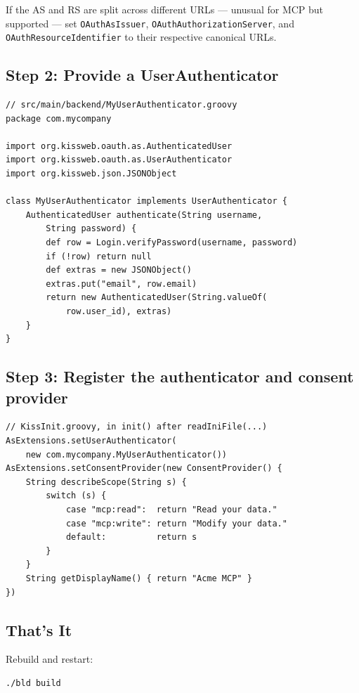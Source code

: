 \noindent
If the AS and RS are split across different URLs --- unusual for MCP but supported --- set \texttt{OAuthAsIssuer}, \texttt{OAuthAuthorizationServer}, and \texttt{OAuthResourceIdentifier} to their respective canonical URLs.

\subsection{Step 2: Provide a UserAuthenticator}

\begin{lstlisting}[style=groovy]
// src/main/backend/MyUserAuthenticator.groovy
package com.mycompany

import org.kissweb.oauth.as.AuthenticatedUser
import org.kissweb.oauth.as.UserAuthenticator
import org.kissweb.json.JSONObject

class MyUserAuthenticator implements UserAuthenticator {
    AuthenticatedUser authenticate(String username,
        String password) {
        def row = Login.verifyPassword(username, password)
        if (!row) return null
        def extras = new JSONObject()
        extras.put("email", row.email)
        return new AuthenticatedUser(String.valueOf(
            row.user_id), extras)
    }
}
\end{lstlisting}

\subsection{Step 3: Register the authenticator and consent provider}

\begin{lstlisting}[style=groovy]
// KissInit.groovy, in init() after readIniFile(...)
AsExtensions.setUserAuthenticator(
    new com.mycompany.MyUserAuthenticator())
AsExtensions.setConsentProvider(new ConsentProvider() {
    String describeScope(String s) {
        switch (s) {
            case "mcp:read":  return "Read your data."
            case "mcp:write": return "Modify your data."
            default:          return s
        }
    }
    String getDisplayName() { return "Acme MCP" }
})
\end{lstlisting}

\subsection{That's It}

Rebuild and restart:

\begin{lstlisting}[style=shell]
./bld build
\end{lstlisting}

